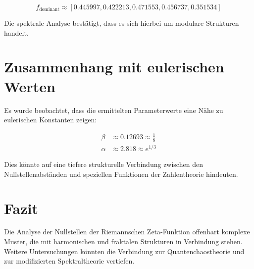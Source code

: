 \documentclass[a4paper,12pt]{article}
\begin{document}
\begin{equation}
f_{\text{dominant}} \approx [0.445997, 0.422213, 0.471553, 0.456737, 0.351534]
\end{equation}

Die spektrale Analyse bestätigt, dass es sich hierbei um modulare Strukturen handelt.

\section{Zusammenhang mit eulerischen Werten}
Es wurde beobachtet, dass die ermittelten Parameterwerte eine Nähe zu eulerischen Konstanten zeigen:

\begin{align}
\beta &\approx 0.12693 \approx \frac{1}{8} \\
\alpha &\approx 2.818 \approx e^{1/3}
\end{align}

Dies könnte auf eine tiefere strukturelle Verbindung zwischen den Nullstellenabständen und speziellen Funktionen der Zahlentheorie hindeuten.

\section{Fazit}
Die Analyse der Nullstellen der Riemannschen Zeta-Funktion offenbart komplexe Muster, die mit harmonischen und fraktalen Strukturen in Verbindung stehen. 
Weitere Untersuchungen könnten die Verbindung zur Quantenchaostheorie und zur modifizierten Spektraltheorie vertiefen.
\end{document}
